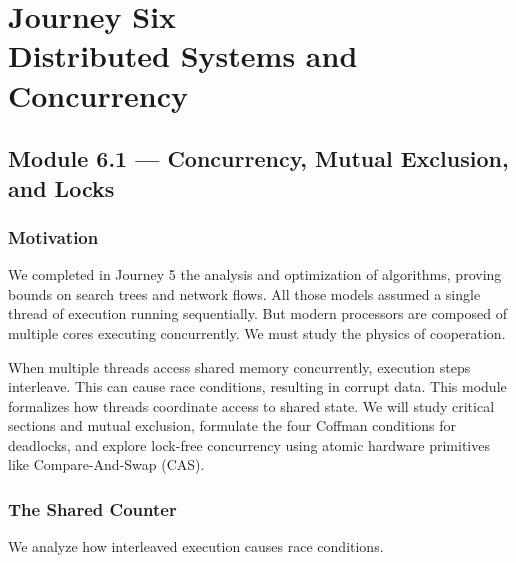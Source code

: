 \documentclass[12pt, a4paper]{book}
\begin{document}
\setcounter{chapter}{5}
\chapter[Journey 6 --- Distributed Systems and Concurrency]
        {Journey Six\\[8pt]
         \textcolor{ModuleColor}{\large Distributed Systems and Concurrency}}
\setcounter{section}{0}

\section{Module 6.1 --- Concurrency, Mutual Exclusion, and Locks}
\label{sec:mod6.1}

\subsection*{Motivation}

We completed in Journey 5 the analysis and optimization of algorithms, proving bounds on search trees and network flows.
All those models assumed a single thread of execution running sequentially.
But modern processors are composed of multiple cores executing concurrently.
We must study the physics of cooperation.

When multiple threads access shared memory concurrently, execution steps interleave.
This can cause race conditions, resulting in corrupt data.
This module formalizes how threads coordinate access to shared state.
We will study critical sections and mutual exclusion, formulate the four Coffman conditions for deadlocks, and explore lock-free concurrency using atomic hardware primitives like Compare-And-Swap (CAS).

\subsection{The Shared Counter}

We analyze how interleaved execution causes race conditions.
\end{document}
